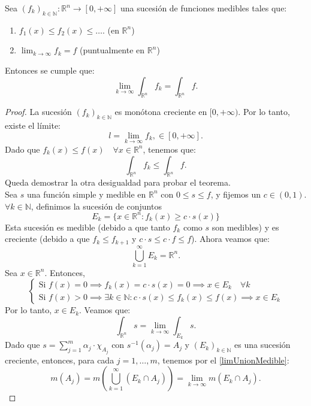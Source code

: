 \begin{teorema} 
    Sea $(f_k)_{k \in \mathbb{N}} : \mathbb{R}^n \to [0, +\infty]$ una sucesión de funciones medibles tales que:
    \begin{enumerate}
        \item $f_1(x) \leq f_2(x) \leq \dots$. (en $\mathbb{R}^n$)
        \item $\lim_{k \to \infty} f_k = f$ (puntualmente en $\mathbb{R}^n$)
    \end{enumerate}
    Entonces se cumple que:
    $$\lim_{k \to \infty} \int_{\mathbb{R}^n} f_k = \int_{\mathbb{R}^n} f.$$
\end{teorema}
\begin{proof}
    La sucesión $(f_k)_{k \in \mathbb{N}}$ es monótona creciente en $[0, +\infty)$.
    Por lo tanto, existe el límite:
    $$ l = \lim\limits_{k \to \infty} f_k, \in [0, +\infty].$$
    Dado que $f_k(x) \leq f(x) \quad \forall x \in \mathbb{R}^n$, tenemos que:
    $$\int_{\mathbb{R}^n} f_k \leq \int_{\mathbb{R}^n} f.$$ Queda demostrar la otra desigualdad para probar el teorema.\\
    Sea $s$ una función simple y medible en $\mathbb{R}^n$ con $0 \leq s \leq f$, y fijemos un $c \in (0, 1)$.
    $\forall k \in \mathbb{N}$, definimos la sucesión de conjuntos $$E_k = \{ x \in \mathbb{R}^n : f_k(x) \geq c \cdot s(x) \}$$ Esta sucesión es medible (debido a que tanto $f_k$ como $s$ son medibles) y es creciente (debido a que $f_k \leq f_{k+1}$ y $c \cdot s \leq c \cdot f \leq f$).
    Ahora veamos que:
    $$
        \bigcup\limits_{k=1}^{\infty} E_k = \mathbb{R}^n.
    $$
    Sea $x \in \mathbb{R}^n$. Entonces,
    \[
        \begin{cases}
            \text{Si } f(x) = 0 \implies f_k(x) = c \cdot s(x) = 0 \implies x \in E_k \quad \forall k \\
            \text{Si } f(x) > 0 \implies \exists k \in \mathbb{N} : c \cdot s(x) \leq f_k(x) \leq f(x) \implies x \in E_k
        \end{cases}
    \]
    Por lo tanto, $x \in E_k$. Veamos que: $$\int_{\mathbb{R}^n} s = \lim\limits_{k
            \to \infty} \int_{E_k} s.$$ Dado que $s = \sum_{j=1}^{m} \alpha_j \cdot
        \chi_{A_j}$ con $s^{-1}(\alpha_j) = A_j$ y $(E_k)_{k \in \mathbb{N}}$ es una
    sucesión creciente, entonces, para cada $j = 1, \ldots, m$, tenemos por el
    \cref{limUnionMedible}: $$ m(A_j) = m \left(\bigcup_{k = 1}^{\infty}(E_k\cap
            A_j)\right) = \lim\limits_{k \to \infty} m(E_k \cap A_j). $$

\end{proof}
